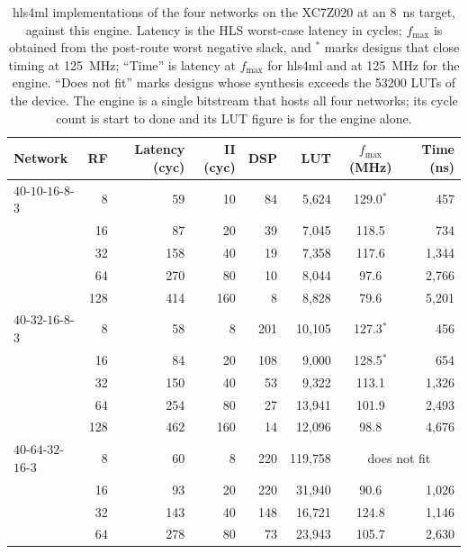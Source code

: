 \documentclass[pdflatex,sn-mathphys-num,iicol]{sn-jnl}
\begin{document}
\begin{table}[t]
\centering
\caption{hls4ml implementations of the four networks on the XC7Z020 at an
\SI{8}{\nano\second} target, against this engine. Latency is the HLS worst-case
latency in cycles; $f_{\max}$ is obtained from the post-route worst negative
slack, and $^{\ast}$ marks designs that close timing at
\SI{125}{\mega\hertz}; ``Time'' is latency at $f_{\max}$ for hls4ml and at \SI{125}{\mega\hertz} for the engine. ``Does not fit'' marks
designs whose synthesis exceeds the \num{53200} LUTs of the device. The engine
is a single bitstream that hosts all four networks; its cycle count is start to
done and its LUT figure is for the engine alone.}
\label{tab:hls4ml}
\small
\begin{tabular*}{\textwidth}{@{\extracolsep{\fill}}lrrrrrcr@{}}
\toprule
Network & RF & Latency (cyc) & II (cyc) & DSP & LUT & $f_{\max}$ (MHz) & Time (ns) \\
\midrule
$40$-$10$-$16$-$8$-$3$ & 8   & 59  & 10  & 84  & 5{,}624  & 129.0$^{\ast}$ & 457 \\
                       & 16  & 87  & 20  & 39  & 7{,}045  & 118.5 & 734 \\
                       & 32  & 158 & 40  & 19  & 7{,}358  & 117.6 & 1{,}344 \\
                       & 64  & 270 & 80  & 10  & 8{,}044  & 97.6  & 2{,}766 \\
                       & 128 & 414 & 160 & 8   & 8{,}828  & 79.6  & 5{,}201 \\
\addlinespace
$40$-$32$-$16$-$8$-$3$ & 8   & 58  & 8   & 201 & 10{,}105 & 127.3$^{\ast}$ & 456 \\
                       & 16  & 84  & 20  & 108 & 9{,}000  & 128.5$^{\ast}$ & 654 \\
                       & 32  & 150 & 40  & 53  & 9{,}322  & 113.1 & 1{,}326 \\
                       & 64  & 254 & 80  & 27  & 13{,}941 & 101.9 & 2{,}493 \\
                       & 128 & 462 & 160 & 14  & 12{,}096 & 98.8  & 4{,}676 \\
\addlinespace
$40$-$64$-$32$-$16$-$3$ & 8   & 60  & 8   & 220 & 119{,}758 & \multicolumn{2}{c}{does not fit} \\
                        & 16  & 93  & 20  & 220 & 31{,}940 & 90.6  & 1{,}026 \\
                        & 32  & 143 & 40  & 148 & 16{,}721 & 124.8 & 1{,}146 \\
                        & 64  & 278 & 80  & 73  & 23{,}943 & 105.7 & 2{,}630 \\

\end{tabular*}
\end{table}
\end{document}
